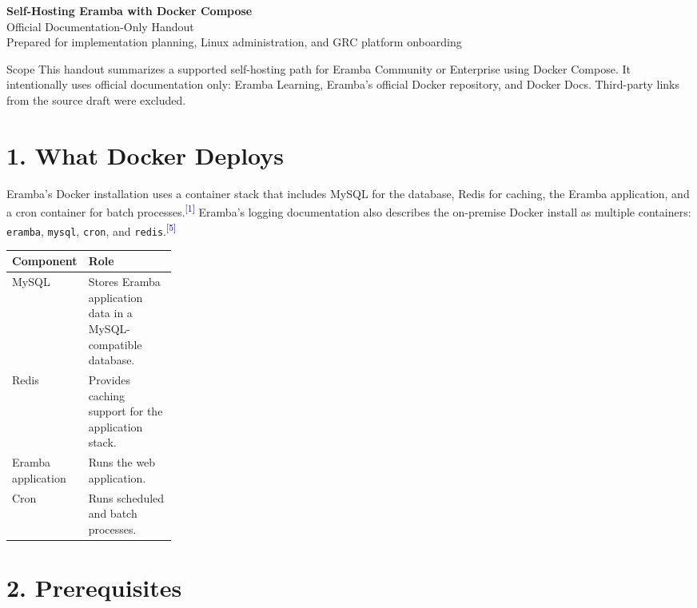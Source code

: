 \documentclass[10pt,letterpaper]{article}
\newcommand{\source}[1]{\textsuperscript{\textcolor{navy}{#1}}}
\begin{document}
\begin{center}
  {\LARGE\bfseries\color{navy} Self-Hosting Eramba with Docker Compose}\\[3pt]
  {\large Official Documentation-Only Handout}\\[6pt]
  {\small Prepared for implementation planning, Linux administration, and GRC platform onboarding}
\end{center}

\begin{infobox}{Scope}
This handout summarizes a supported self-hosting path for Eramba Community or Enterprise using Docker Compose. It intentionally uses official documentation only: Eramba Learning, Eramba's official Docker repository, and Docker Docs. Third-party links from the source draft were excluded.
\end{infobox}

\section{1. What Docker Deploys}
Eramba's Docker installation uses a container stack that includes MySQL for the database, Redis for caching, the Eramba application, and a cron container for batch processes.\source{[1]} Eramba's logging documentation also describes the on-premise Docker install as multiple containers: \texttt{eramba}, \texttt{mysql}, \texttt{cron}, and \texttt{redis}.\source{[5]}

\begin{center}
\begin{tabularx}{\linewidth}{L{0.24\linewidth}Y}
\toprule
\textbf{Component} & \textbf{Role} \\
\midrule
MySQL & Stores Eramba application data in a MySQL-compatible database. \\
Redis & Provides caching support for the application stack. \\
Eramba application & Runs the web application. \\
Cron & Runs scheduled and batch processes. \\
\bottomrule
\end{tabularx}
\end{center}

\section{2. Prerequisites}
\end{document}

